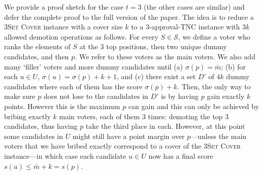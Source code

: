 \documentclass[letterpaper]{article} %
\newcommand{\CTSC}{\textsc{3Set Cover}}
\newcommand{\SB}{\textsc{TNC}}
\newcommand{\NP}{\mathrm{NP}}
\begin{document}
We provide a proof sketch for the case $t=3$ (the other cases are similar) and defer the complete proof to the full version of the paper. The idea is to reduce  a \CTSC{} instance with a cover size $k$ to a $3$-approval-\SB{} instance with  $3k$ allowed demotion operations as follows. For every $S \in \mathcal{S}$, we define a voter who ranks the elements of $S$ at the $3$ top positions, then two unique dummy candidates, and then $p$. We refer to these voters as the main voters. We also add many `filler' voters and more dummy candidates until (a) $\sigma(p)=\bar{m}$; (b) for each $u \in U$,  $\sigma(u) = \sigma(p) + k + 1$, and (c) there exist a set $D'$ of $4k$ dummy candidates where each of them has the score $\sigma(p) + k$. Then, the only way to make sure $p$ does not lose to the candidates in $D'$ is by having $p$ gain exactly $k$ points. However this is the maximum $p$ can gain and this can only be achieved by bribing exactly $k$ main voters, each of them $3$ times: demoting the top $3$ candidates, thus having $p$ take the third place in each. However, at this point some candidates in $U$ might still have a point margin over $p$---unless the main voters that we have bribed exactly correspond to a cover of the \CTSC{} instance---in which case each candidate $u \in U$ now has a final score $s(u) \leq \bar{m} + k = s(p)$.




\end{document}
